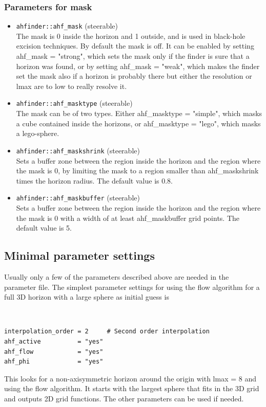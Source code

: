 \subsubsection*{Parameters for mask}
\begin{itemize}
\item {\tt ahfinder::ahf\_mask} (steerable) \\
        The mask is 0 inside the horizon and 1 outside, and is used in
        black-hole excision techniques. By default the mask is off. It
        can be enabled by setting ahf\_mask = "strong", which sets the mask
        only if the finder is sure that a horizon was found, or by setting
        ahf\_mask = "weak", which makes the finder set the mask also if a
        horizon is probably there but either the resolution or lmax are to
        low to really resolve it.
\item {\tt ahfinder::ahf\_masktype} (steerable) \\
        The mask can be of two types. Either ahf\_masktype = "simple",
        which masks a cube contained inside the horizons, or ahf\_masktype
        = "lego", which masks a lego-sphere.
\item {\tt ahfinder::ahf\_maskshrink} (steerable) \\
        Sets a buffer zone between the region inside the horizon and the
        region where the mask is 0, by limiting the mask to a region smaller
        than ahf\_maskshrink times the horizon radius. The default value
        is 0.8.
\item {\tt ahfinder::ahf\_maskbuffer} (steerable) \\
        Sets a buffer zone between the region inside the horizon and the
        region where the mask is 0 with a width of at least ahf\_maskbuffer
        grid points. The default value is 5.
\end{itemize}
\subsection{Minimal parameter settings}
Usually only a few of the parameters described above are needed in the
parameter file. The simplest parameter settings for using the flow
algorithm for a full 3D horizon with a large sphere as initial guess is
{\tt
\begin{verbatim}
interpolation_order = 2     # Second order interpolation
ahf_active          = "yes"
ahf_flow            = "yes"
ahf_phi             = "yes"
\end{verbatim}
}
This looks for a non-axisymmetric horizon around the origin with lmax = 8
and using the flow algorithm. It starts with the largest sphere that fits
in the 3D grid and outputs 2D grid functions. The other parameters can be
used if needed.
